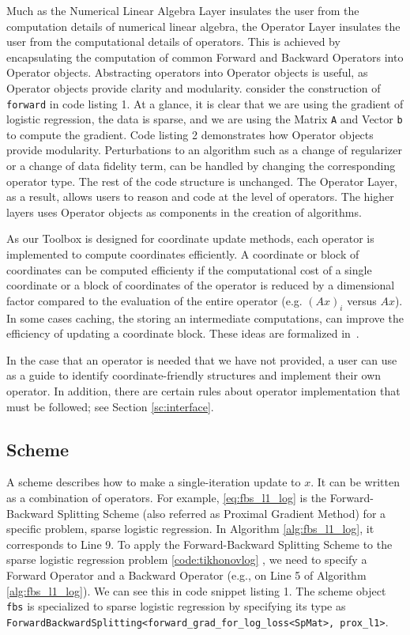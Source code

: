 Much as the Numerical Linear Algebra Layer insulates the user from the computation details of numerical linear algebra, the Operator Layer insulates the user from the computational details of operators. This is achieved by encapsulating the computation of common Forward and Backward Operators into Operator objects. Abstracting operators into Operator objects is useful, as Operator objects provide clarity and modularity. consider the construction of  \texttt{forward} in code listing 1. At a glance, it is clear that we are using the gradient of logistic regression, the data is sparse, and we are using the Matrix \texttt{A} and Vector \texttt{b} to compute the gradient. Code listing 2 demonstrates how Operator objects provide modularity. Perturbations to an algorithm such as a change of regularizer or a change of data fidelity term, can be handled by changing the corresponding operator type. The rest of the code structure is unchanged. The Operator Layer, as a result, allows users to reason and code at the level of operators. 
The higher layers uses Operator objects as components in the creation of algorithms.
 
As our Toolbox is designed for coordinate update methods, each operator is implemented to compute coordinates efficiently.
 A coordinate or block of coordinates can be computed efficienty if the computational cost of a single coordinate or a block of coordinates of the operator is reduced by a dimensional factor compared to the evaluation of the entire operator (e.g. $(Ax)_i$ versus $Ax$). 
 In some cases caching, the storing an intermediate computations, can improve the efficiency of updating a coordinate block. These ideas are formalized in~\citep{PengWuXuYanYin2016_coordinate}.

In the case that an operator is needed that we have not provided, a user can use~\citep{PengWuXuYanYin2016_coordinate} as a guide to identify coordinate-friendly structures and implement their own operator. In addition, there are certain rules about operator implementation that must be followed; see Section \ref{sc:interface}.


\subsection{Scheme}
A scheme describes how to make a single-iteration update to $x$.
It can be written as a combination of operators. For example, \eqref{eq:fbs_l1_log} is the Forward-Backward Splitting Scheme (also referred as Proximal Gradient Method) for a specific problem, sparse logistic regression. In Algorithm \ref{alg:fbs_l1_log}, it corresponds to Line 9. To apply the Forward-Backward Splitting Scheme to the sparse logistic regression problem \ref{code:tikhonovlog} , we need to specify a Forward Operator and a Backward Operator (e.g., on Line 5 of Algorithm \ref{alg:fbs_l1_log}). We can see this in code snippet listing 1.
The scheme object \texttt{fbs} is specialized to sparse logistic regression by specifying its type as \texttt{ForwardBackwardSplitting<forward\_grad\_for\_log\_loss<SpMat>, prox\_l1>}.

